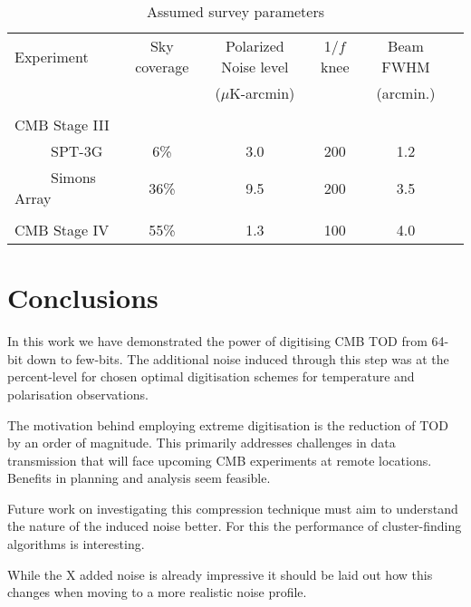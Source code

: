 \documentclass[apj]{emulateapj}
\begin{document}
\begin{table*}[tbh]
\begin{center}
\caption{\label{tab:experiments} Assumed survey parameters}
\small
\begin{tabular}{l || c c c c c }
Experiment & Sky coverage & Polarized Noise level  & 1/$f$ knee & Beam FWHM \\
& &($\mu$K-arcmin)&&(arcmin.)\\
\hline
\tiny \\ \small
CMB Stage III & & & & \\
~~~~~SPT-3G & 6\% & 3.0 & 200 & 1.2 \\
~~~~~Simons Array & 36\% & 9.5 & 200 & 3.5 \\ 
\tiny \\ \small
CMB Stage IV & 55\% & 1.3 & 100 & 4.0 \\
\end{tabular}
 \normalsize
\end{center}
\end{table*}

\section{Conclusions}
\label{sec:conclusions}

In this work we have demonstrated the power of digitising CMB TOD from 64-bit down to few-bits. The additional noise induced through this step was at the percent-level for chosen optimal digitisation schemes for temperature and polarisation observations.

The motivation behind employing extreme digitisation is the reduction of TOD by an order of magnitude. This primarily addresses challenges in data transmission that will face upcoming CMB experiments at remote locations. Benefits in planning and analysis seem feasible.

Future work on investigating this compression technique must aim to understand the nature of the induced noise better. For this the performance of cluster-finding algorithms is interesting.

While the X added noise is already impressive it should be laid out how this changes when moving to a more realistic noise profile.
\end{document}
